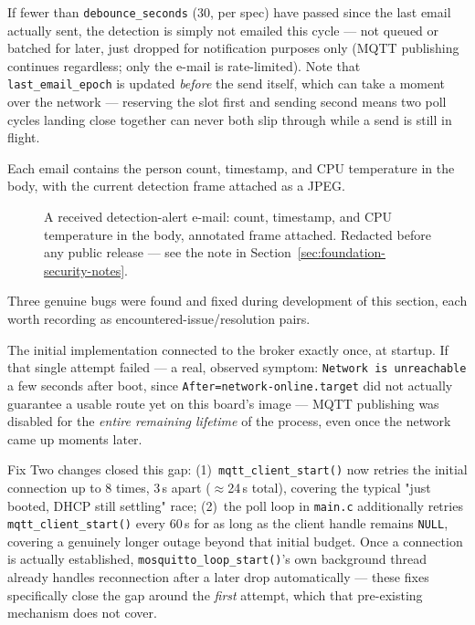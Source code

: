 If fewer than \texttt{debounce\_seconds} (30, per spec) have passed since
the last email actually sent, the detection is simply not emailed this
cycle --- not queued or batched for later, just dropped for notification
purposes only (MQTT publishing continues regardless; only the e-mail is
rate-limited). Note that \texttt{last\_email\_epoch} is updated
\emph{before} the send itself, which can take a moment over the network
--- reserving the slot first and sending second means two poll cycles
landing close together can never both slip through while a send is still
in flight.

Each email contains the person count, timestamp, and CPU temperature in
the body, with the current detection frame attached as a JPEG.

\begin{figure}[H]
\centering
\caption{A received detection-alert e-mail: count, timestamp, and CPU temperature in the body, annotated frame attached. \alert{Redacted before any public release} --- see the note in Section~\ref{sec:foundation-security-notes}.}\label{fig:email-alert}
\end{figure}


Three genuine bugs were found and fixed during development of this
section, each worth recording as encountered-issue/resolution pairs.


The initial implementation connected to the broker exactly once, at
startup. If that single attempt failed --- a real, observed symptom:
\texttt{Network is unreachable} a few seconds after boot, since
\texttt{After=network-online.target} did not actually guarantee a usable
route yet on this board's image --- MQTT publishing was disabled for the
\emph{entire remaining lifetime} of the process, even once the network
came up moments later.

\begin{resultbox}{Fix}
Two changes closed this gap: (1)~\texttt{mqtt\_client\_start()} now
retries the initial connection up to 8 times, 3\,s apart ($\approx$24\,s
total), covering the typical "just booted, DHCP still settling" race;
(2)~the poll loop in \texttt{main.c} additionally retries
\texttt{mqtt\_client\_start()} every 60\,s for as long as the client
handle remains \texttt{NULL}, covering a genuinely longer outage beyond
that initial budget. Once a connection is actually established,
\texttt{mosquitto\_loop\_start()}'s own background thread already
handles reconnection after a later drop automatically --- these fixes
specifically close the gap around the \emph{first} attempt, which that
pre-existing mechanism does not cover.
\end{resultbox}

